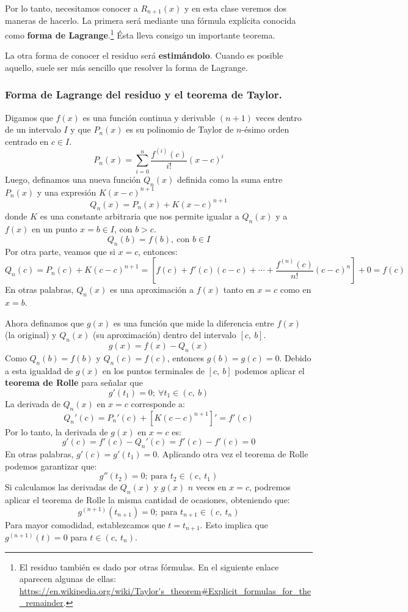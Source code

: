 \documentclass[12pt]{article}
\begin{document}
Por lo tanto, necesitamos conocer a $R_{n + 1}(x)$ y en esta clase veremos dos maneras de hacerlo. La primera será mediante una fórmula explícita conocida como \textbf{forma de Lagrange}.\footnote{El residuo también es dado por otras fórmulas. En el siguiente enlace aparecen algunas de ellas: \url{https://en.wikipedia.org/wiki/Taylor's_theorem\#Explicit_formulas_for_the_remainder}.} Ésta lleva consigo un importante teorema.

La otra forma de conocer el residuo será \textbf{estimándolo}. Cuando es posible aquello, suele ser más sencillo que resolver la forma de Lagrange.

\subsubsection{Forma de Lagrange del residuo y el teorema de Taylor.}

Digamos que $f(x)$ es una función continua y derivable $(n + 1)$ veces dentro de un intervalo $I$ y que $P_{n}(x)$ es su polinomio de Taylor de $n$-ésimo orden centrado en $c \in I$.
\[
  P_{n}(x) = \sum_{i = 0}^{n} \frac{f^{(i)}(c)}{i!}(x - c)^{i}
\]
Luego, definamos una nueva función $Q_{n}(x)$ definida como la suma entre $P_{n}(x)$ y una expresión $K(x - c)^{n + 1}$
\[
  Q_{n}(x) = P_{n}(x) + K(x - c)^{n + 1}
\]
donde $K$ es una constante arbitraria que nos permite igualar a $Q_{n}(x)$ y a $f(x)$ en un punto $x = b \in I$, con $b > c$.
\[
  Q_{n}(b) = f(b), \ \text{con } b \in I
\]
Por otra parte, veamos que si $x = c$, entonces:
\[
  Q_{n}(c) = P_{n}(c) + K(c - c)^{n + 1}
           = \left[f(c) + f'(c)(c - c) + \cdots + \frac{f^{(n)}(c)}{n!}(c - c)^{n}\right] + 0
           = f(c)
\]
En otras palabras, $Q_{n}(x)$ es una aproximación a $f(x)$ tanto en $x = c$ como en $x = b$.

Ahora definamos que $g(x)$ es una función que mide la diferencia entre $f(x)$ (la original) y $Q_{n}(x)$ (su aproximación) dentro del intervalo $[c, \ b]$.
\[
  g(x) = f(x) - Q_{n}(x)
\]
Como $Q_{n}(b) = f(b)$ y $Q_{n}(c) = f(c)$, entonces $g(b) = g(c) = 0$. Debido a esta igualdad de $g(x)$ en los puntos terminales de $[c, \ b]$ podemos aplicar el \textbf{teorema de Rolle} para señalar que
\[
  g'(t_{1}) = 0; \ \forall t_{1} \in (c, \ b)
\]
La derivada de $Q_{n}(x)$ en $x = c$ corresponde a:
\[
  Q_{n}'(c) = P_{n}'(c) + [K(c - c)^{n + 1}]' = f'(c)
\]
Por lo tanto, la derivada de $g(x)$ en $x = c$ es:
\[
  g'(c) = f'(c) - Q_{n}'(c) = f'(c) - f'(c) = 0
\]
En otras palabras, $g'(c) = g'(t_{1}) = 0$. Aplicando otra vez el teorema de Rolle podemos garantizar que:
\[
  g''(t_{2}) = 0; \ \text{para } t_{2} \in (c, \ t_{1})
\]
Si calculamos las derivadas de $Q_{n}(x)$ y $g(x)$ $n$ veces en $x = c$, podremos aplicar el teorema de Rolle la misma cantidad de ocasiones, obteniendo que:
\[
  g^{(n + 1)}(t_{n + 1}) = 0; \ \text{para } t_{n + 1} \in (c, \ t_{n})
\]
Para mayor comodidad, establezcamos que $t = t_{n + 1}$. Esto implica que $g^{(n + 1)}(t) = 0$ para $t \in (c, \ t_{n})$.
\end{document}
